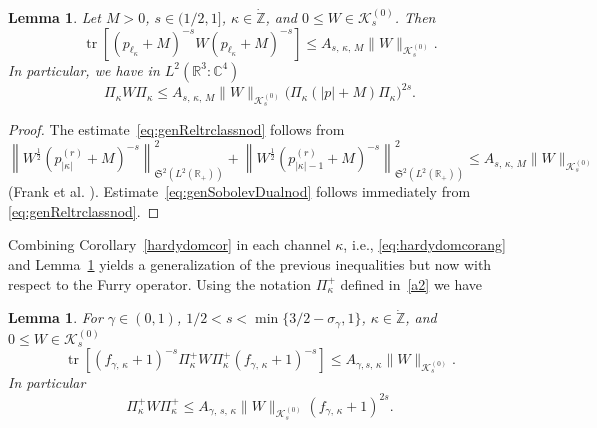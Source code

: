\documentclass[10pt]{amsart}
\newtheorem{lemm}[cdrthm]{Lemma}
\theoremstyle{definition}
\DeclareMathOperator{\tr}{tr}
\newcommand*\cz{\mathbb{C}}
\newcommand*\gz{\mathbb{Z}}
\newcommand*\rz{\mathbb{R}}
\newcommand*\zp{\dot{\gz}}
\newcommand*\cK{\mathcal{K}}
\newcommand*\gS{\mathfrak{S}}
\begin{document}
\begin{lemm}\label{genReltrclassnod}
Let $M>0$, $s\in(1/2,1]$, $\kappa\in\zp$, and $0\leq W \in\cK_{s}^{(0)}$. Then
\begin{equation}\label{eq:genReltrclassnod}
\tr\left[\left(p_{\ell_\kappa}+M\right)^{-s}W\left(p_{\ell_\kappa}+M\right)^{-s}\right]
\leq A_{s,\,\kappa,\,M} \|W\|_{\cK_{s}^{(0)}}.
\end{equation}
In particular, we have in $L^2(\rz^3:\cz^4)$
\begin{equation}\label{eq:genSobolevDualnod}
\Pi_{\kappa} W\Pi_{\kappa}
\leq A_{s,\,\kappa,\,M} \|W\|_{\cK_{s}^{(0)}} \big(\Pi_{\kappa}(|p|+M)\Pi_{\kappa}\big)^{2s}.
\end{equation}
\end{lemm}

\begin{proof}
The estimate~\eqref{eq:genReltrclassnod} follows from
\[
\left\|W^{\frac12}\left(p_{|\kappa|}^{(r)}+M\right)^{-s}\right\|_{\gS^2\left(L^2\left(\rz_+\right)\right)}^2 + \left\|W^{\frac12}\left(p_{|\kappa|-1}^{(r)}+M\right)^{-s}\right\|_{\gS^2\left(L^2\left(\rz_+\right)\right)}^2
\leq A_{s,\,\kappa,\,M} \|W\|_{\cK_{s}^{(0)}}
\]
(Frank et al. \cite[Proposition~4.4]{Franketal2020P}). Estimate~\eqref{eq:genSobolevDualnod} follows immediately from \eqref{eq:genReltrclassnod}.
\end{proof}

Combining Corollary~\ref{hardydomcor} in each channel $\kappa$, i.e., \eqref{eq:hardydomcorang} and Lemma~\ref{genReltrclassnod} yields a generalization of the previous inequalities but now with respect to the Furry operator. Using the notation $\Pi^+_\kappa$ defined in~\eqref{a2} we have
\begin{lemm}\label{genReltrclassHydro}
For $\gamma\in(0,1)$, $1/2<s<\min\{3/2-\sigma_\gamma,1\}$, $\kappa\in\zp$, and \linebreak$0\leq W \in\cK_{s}^{(0)}$
\begin{equation}\label{eq:genReltrclassHydro}
\tr\left[\left(f_{\gamma,\,\kappa}+1\right)^{-s}\Pi^+_\kappa W\Pi^+_{\kappa} \left(f_{\gamma,\,\kappa}+1\right)^{-s}\right]
\leq A_{\gamma,s,\,\kappa} \|W\|_{\cK_{s}^{(0)}}.
\end{equation}
In particular
\begin{equation}\label{eq:genSobolevDualHydro}
\Pi_{\kappa}^+W\Pi_{\kappa}^+
\leq A_{\gamma,\,s,\,\kappa} \|W\|_{\cK_{s}^{(0)}} \left(f_{\gamma,\,\kappa}+1\right)^{2s}.
\end{equation}
\end{lemm}
\end{document}
